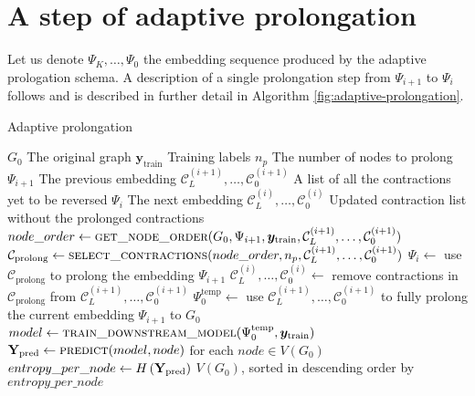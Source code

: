 \section{A step of adaptive prolongation}\label{sec:app:prolongation-step}

Let us denote \( \Psi_K, \dots, \Psi_0 \) the embedding sequence produced by the adaptive prologation schema. A description of a single prolongation step from \( \Psi_{i + 1} \) to \( \Psi_i \) follows and is described in further detail in Algorithm \ref{fig:adaptive-prolongation}.

\begin{algorithm*}
  \caption{Adaptive prolongation}
  \label{alg:adaptive-prolongation}
  \begin{algorithmic}
    \Require $ G_0 $ \Comment The original graph
    \Require $ \bm{y}_\mathrm{train} $ \Comment Training labels
    \Require $ n_p $ \Comment The number of nodes to prolong
    \Require $ \Psi_{i + 1} $ \Comment The previous embedding
    \Require $ \mathcal{C}_L^{(i + 1)}, \dots, \mathcal{C}_0^{(i + 1)} $ \Comment A list of all the contractions yet to be reversed
    \Ensure $ \Psi_i $ \Comment The next embedding
    \Ensure $ \mathcal{C}_L^{(i)}, \dots, \mathcal{C}_0^{(i)} $ \Comment Updated contraction list without the prolonged contractions
    \Statex
    \State $ node\_order \gets \Call{get\_node\_order}{G_0, \Psi_{i+1}, \bm{y}_\mathrm{train}, \mathcal{C}_L^{(i + 1)}, \dots, \mathcal{C}_0^{(i + 1)}} $
    \State $ \mathcal{C}_\mathrm{prolong} \gets \Call{select\_contractions}{node\_order, n_p, \mathcal{C}_L^{(i + 1)}, \dots, \mathcal{C}_0^{(i + 1)}} $
    \State $ \Psi_i \gets $ use $ \mathcal{C}_\mathrm{prolong} $ to prolong the embedding $ \Psi_{i + 1} $
    \State $ \mathcal{C}_L^{(i)}, \dots, \mathcal{C}_0^{(i)} \gets $ remove contractions in $ \mathcal{C}_\mathrm{prolong} $ from $ \mathcal{C}_L^{(i + 1)}, \dots, \mathcal{C}_0^{(i + 1)} $
    \Statex
        \State $ \Psi_0^\mathrm{temp} \gets $ use $ \mathcal{C}_L^{(i + 1)}, \dots, \mathcal{C}_0^{(i + 1)} $ to fully prolong the current embedding $ \Psi_{i+1} $ to $ G_0 $
        \State $ model \gets \Call{train\_downstream\_model}{\Psi_0^\mathrm{temp}, \bm{y}_\mathrm{train}} $
        \State $ \mathmat{Y}_\mathrm{pred} \gets \Call{predict}{model, node} $ for each $ node \in V \left( G_0 \right) $
        \State $ entropy\_per\_node \gets H \left( \mathbf{Y}_\mathrm{pred} \right) $
        \State \Return $ V \left( G_0 \right) $, sorted in descending order by $ entropy\_per\_node $

\end{algorithmic}
\end{algorithm*}
